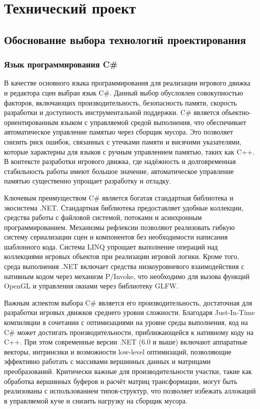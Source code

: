 \section{Технический проект}
\subsection{Обоснование выбора технологий проектирования}
\subsubsection{Язык программирования C\#}
В качестве основного языка программирования для реализации игрового движка и редактора сцен выбран язык C\#. Данный выбор обусловлен совокупностью факторов, включающих производительность, безопасность памяти, скорость разработки и доступность инструментальной поддержки. C\# является объектно-ориентированным языком с управляемой средой выполнения, что обеспечивает автоматическое управление памятью через сборщик мусора. Это позволяет снизить риск ошибок, связанных с утечками памяти и висячими указателями, которые характерны для языков с ручным управлением памятью, таких как C++. В контексте разработки игрового движка, где надёжность и долговременная стабильность работы имеют большое значение, автоматическое управление памятью существенно упрощает разработку и отладку.

Ключевым преимуществом C\# является богатая стандартная библиотека и экосистема .NET. Стандартная библиотека предоставляет удобные коллекции, средства работы с файловой системой, потоками и асинхронным программированием. Механизмы рефлексии позволяют реализовать гибкую систему сериализации сцен и компонентов без необходимости написания шаблонного кода. Система LINQ упрощает выполнение операций над коллекциями игровых объектов при реализации игровой логики. Кроме того, среда выполнения .NET включает средства низкоуровневого взаимодействия с нативным кодом через механизм P/Invoke, что необходимо для вызова функций OpenGL и управления окнами через библиотеку GLFW.

Важным аспектом выбора C\# является его производительность, достаточная для разработки игровых движков среднего уровня сложности. Благодаря Just-In-Time компиляции в сочетании с оптимизациями на уровне среды выполнения, код на C\# может достигать производительности, приближающейся к нативному коду на C++. При этом современные версии .NET (6.0 и выше) включают аппаратные векторы, интринсики и возможности low-level оптимизаций, позволяющие эффективно работать с массивами вершинных данных и матрицами преобразований. Критически важные для производительности участки, такие как обработка вершинных буферов и расчёт матриц трансформации, могут быть реализованы с использованием типов-структур, что позволяет избежать аллокаций в управляемой куче и снизить нагрузку на сборщик мусора.

